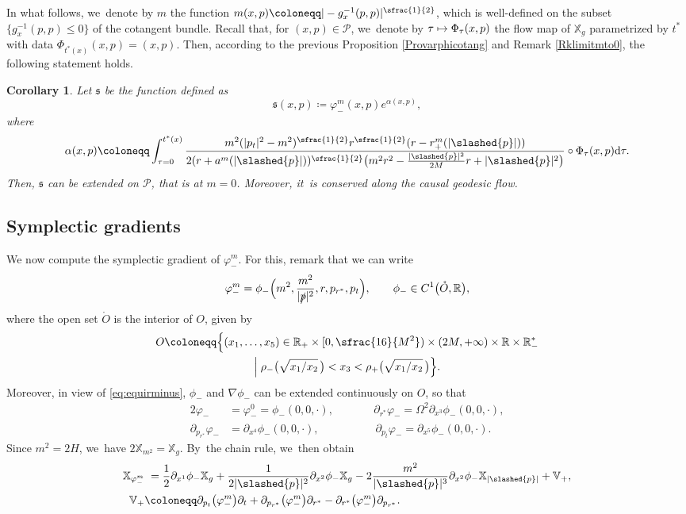 \documentclass[JEP,XML,SOM,Unicode,published]{cedram}
\newcommand\mto{\mathchoice{\longmapsto}{\mapsto}{\mapsto}{\mapsto}}
\theoremstyle{plain}
\newtheorem{corollary}[proposition]{Corollary}
\theoremstyle{definition}
\newcommand\R{{\mathbb{R}}}
\newcommand\T{{\mathbb{X}}}
\newcommand\dr{{\mathrm{d}}}
\begin{document}
In what follows, we~denote by $m$ the function $m(x,p)\coloneqq |-g_x^{-1}(p,p)|^{\sfrac{1}{2}}$, which is well-defined on the subset $\{g_x^{-1}(p,p) \leq 0 \}$ of the cotangent bundle. Recall that, for $(x,p) \in \mathcal{P}$, we~denote by $\tau \mto \Phi_{\tau}(x,p)$ the flow map of $\T_g$ parametrized by $t^*$ with data $\Phi_{t^*(x)}(x,p)=(x,p)$. Then, according to the previous Proposition \ref{Provarphicotang} and Remark \ref{Rklimitmto0}, the following statement holds.
\begin{corollary}\label{Corvarphicotang}
Let $\mathfrak{s}$ be the function defined as
\[
\mathfrak{s}(x,p)\coloneqq \varphi_-^m (x,p) e^{\alpha (x,p)},
\]
where
\[
\alpha(x,p)\coloneqq \int_{\tau=0}^{t^*(x)} \frac{m^2(|p_t|^2-m^2)^{\sfrac{1}{2}}r^{\sfrac{1}{2}}(r-r^{m}_+(|\slashed{p}|))}{2(r+a^{m}(|\slashed{p}|))^{\sfrac{1}{2}}\bigl(m^2 r^2-\frac{|\slashed{p}|^2}{2M}r+|\slashed{p}|^2\bigr)} \circ \Phi_{\tau}(x,p) \dr \tau.
\]
Then, $\mathfrak{s}$ can be extended on $\mathcal{P}$, that is at $m=0$. Moreover, it~is conserved along the causal geodesic flow.
\end{corollary}

\subsection{Symplectic gradients}\label{Subsecsympgrad}

We now compute the symplectic gradient of $\varphi_-^m$. For this, remark that we can write
\[
\varphi_-^m = \phi_- \Bigl(m^2,\frac{m^2}{|\slashed{p}|^2}, r,p_{r^*},p_t \Bigr),\qquad \phi_- \in C^1 \bigl(\mathring{O},\R \bigr),
\]
where the open set $\mathring{O}$ is the interior of $O$, given by
\begin{multline*}
O \coloneqq \Bigl\{(x_1,\dots,x_5) \in \R_+\times[0,\sfrac{16}{M^2})\times (2M,+\infty) \times \R \times \R_-^* \\
\Bigm| \rho_- \bigl(\sqrt{x_1/x_2} \, \bigr)<x_3< \rho_+ \bigl(\sqrt{x_1/x_2} \,\bigr) \Bigr\}.
\end{multline*}
Moreover, in view of \eqref{eq:equirminus}, $\phi_-$ and $\nabla \phi_-$ can be extended continuously on $O$, so that
\begin{alignat*}{2}
\varphi_-&=\varphi_-^0= \phi_-(0,0,\cdot),\qquad && \partial_{r^*} \varphi_-= \Omega^2 \partial_{x^3}\phi_-(0,0, \cdot), \\
\partial_{p_{r^*}} \varphi_- &= \partial_{x^4}\phi_-(0,0, \cdot), \qquad && \, \partial_{p_t} \varphi_-= \partial_{x^5}\phi_-(0,0, \cdot).
\end{alignat*}
Since $m^2=2H$, we~have
$2 \T_{m^2}=\T_g$. By~the chain rule, we~then obtain
\begin{align*}
\T_{\varphi_-^m} & \hphantom{:}= \frac{1}{2}\partial_{x^1} \phi_- \T_g +\frac{1}{2|\slashed{p}|^2} \partial_{x^2} \phi_- \T_g-2\frac{m^2}{|\slashed{p}|^3}\partial_{x^2} \phi_- \T_{|\slashed{p}|}+ \mathbb{V}_+, \\
\mathbb{V}_+ & \coloneqq \partial_{p_t}\bigl(\varphi_-^m \bigr) \partial_t+ \partial_{p_{r^*}}\bigl(\varphi_-^m \bigr) \partial_{r^*}-\partial_{r^*}\bigl(\varphi_-^m \bigr) \partial_{p_{r^*}}.
\end{align*}
\end{document}
